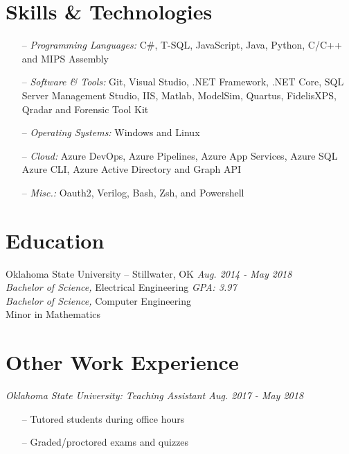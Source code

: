 \documentclass[line,overlapped,9pt]{res}
\begin{document}
\begin{resume}
     \section{Skills \& Technologies}

            \begin{itemize} 
            \item[--] {\sl Programming Languages:} C\#, T-SQL, JavaScript, Java, Python, C/C++ and MIPS Assembly 
            \item[--] {\sl Software \& Tools:} Git, Visual Studio, .NET Framework, .NET Core,
              SQL Server Management Studio, IIS, Matlab, ModelSim, Quartus,
              FidelisXPS, Qradar and Forensic Tool Kit 
            \item[--] {\sl Operating Systems:} Windows and Linux
            \item[--] {\sl Cloud:} Azure DevOps, Azure Pipelines, Azure App Services, Azure SQL
              Azure CLI, Azure Active Directory and Graph API
            \item[--] {\sl Misc.:} Oauth2, Verilog, Bash, Zsh, and Powershell  
            \end{itemize} 

      \section{Education} Oklahoma State University -- Stillwater, OK \hfill {\sl Aug. 2014 - May 2018} \\
            {\sl Bachelor of Science,} Electrical Engineering \hfill {\sl GPA: 3.97}\\
            {\sl Bachelor of Science,} Computer Engineering \\
            Minor in Mathematics 
                
    \section{Other Work Experience}

            {\sl Oklahoma State University: Teaching Assistant \hfill Aug. 2017 - May 2018}
            \begin{itemize}  %
            \item[--] Tutored students during office hours 
            \item[--] Graded/proctored exams and quizzes
            \end{itemize} 


\end{resume}
\end{document}

